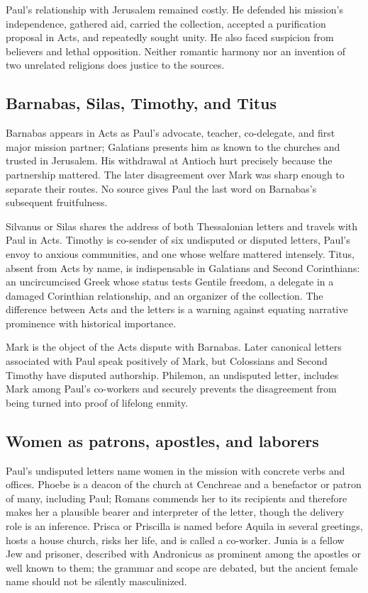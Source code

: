 Paul's relationship with Jerusalem remained costly. He defended his mission's
independence, gathered aid, carried the collection, accepted a purification
proposal in Acts, and repeatedly sought unity. He also faced suspicion from
believers and lethal opposition. Neither romantic harmony nor an invention of
two unrelated religions does justice to the sources.

\subsection{Barnabas, Silas, Timothy, and Titus}

Barnabas appears in Acts as Paul's advocate, teacher, co-delegate, and first
major mission partner; Galatians presents him as known to the churches and
trusted in Jerusalem. His withdrawal at Antioch hurt precisely because the
partnership mattered. The later disagreement over Mark was sharp enough to
separate their routes. No source gives Paul the last word on Barnabas's
subsequent fruitfulness.

Silvanus or Silas shares the address of both Thessalonian letters and travels
with Paul in Acts. Timothy is co-sender of six undisputed or disputed letters,
Paul's envoy to anxious communities, and one whose welfare mattered intensely.
Titus, absent from Acts by name, is indispensable in Galatians and Second
Corinthians: an uncircumcised Greek whose status tests Gentile freedom, a
delegate in a damaged Corinthian relationship, and an organizer of the
collection. The difference between Acts and the letters is a warning against
equating narrative prominence with historical importance.

Mark is the object of the Acts dispute with Barnabas. Later canonical letters
associated with Paul speak positively of Mark, but Colossians and Second
Timothy have disputed authorship. Philemon, an undisputed letter, includes
Mark among Paul's co-workers and securely prevents the disagreement from being
turned into proof of lifelong enmity.

\subsection{Women as patrons, apostles, and laborers}

Paul's undisputed letters name women in the mission with concrete verbs and
offices. Phoebe is a deacon of the church at Cenchreae and a benefactor or
patron of many, including Paul; Romans commends her to its recipients and
therefore makes her a plausible bearer and interpreter of the letter, though
the delivery role is an inference. Prisca or Priscilla is named before Aquila
in several greetings, hosts a house church, risks her life, and is called a
co-worker. Junia is a fellow Jew and prisoner, described with Andronicus as
prominent among the apostles or well known to them; the grammar and scope are
debated, but the ancient female name should not be silently masculinized.

